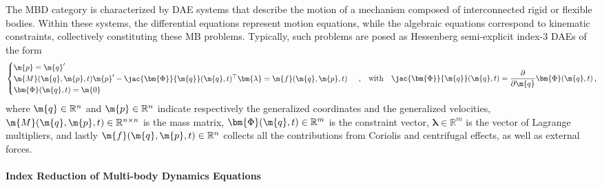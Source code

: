 The \ac{MBD} category is characterized by \ac{DAE} systems that describe the motion of a mechanism composed of interconnected rigid or flexible bodies. Within these systems, the differential equations represent motion equations, while the algebraic equations correspond to kinematic constraints, collectively constituting these \ac{MB} problems. Typically, such problems are posed as Hessenberg semi-explicit index-3 \acp{DAE} of the form
%
\begin{equation}
  \begin{cases}
    \m{p} = \m{q}^{\prime} \\
    \m{M}(\m{q}, \m{p}, t)\m{p}^{\prime} - \jac{\bm{\Phi}}{\m{q}}(\m{q}, t)^{\top}\bm{\lambda} = \m{f}(\m{q}, \m{p} ,t) \\
    \bm{\Phi}(\m{q}, t) = \m{0}
  \end{cases} \, \text{,}
  \quad \text{with} \quad \jac{\bm{\Phi}}{\m{q}}(\m{q}, t) = \dfrac{\partial}{\partial\m{q}}\bm{\Phi}(\m{q}, t)
  \, \text{,}
  \label{chap5:eq:mbd_fo}
\end{equation}
%
where $\m{q} \in \mathbb{R}^{n}$ and $\m{p} \in \mathbb{R}^{n}$ indicate respectively the generalized coordinates and the generalized velocities, $\m{M}(\m{q}, \m{p}, t) \in \mathbb{R}^{n\times n}$ is the mass matrix, $\bm{\Phi}(\m{q}, t) \in \mathbb{R}^{m}$ is the constraint vector, $\bm{\lambda} \in \mathbb{R}^{m}$ is the vector of Lagrange multipliers, and lastly $\m{f}(\m{q}, \m{p}, t) \in \mathbb{R}^{n}$ collects all the contributions from Coriolis and centrifugal effects, as well as external forces.

\paragraph{Index Reduction of Multi-body Dynamics Equations}

